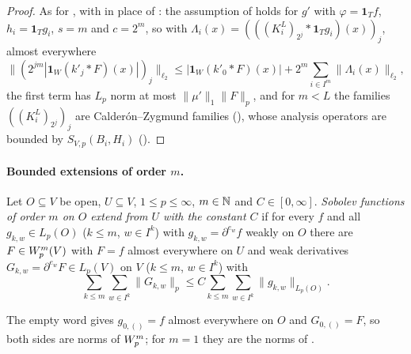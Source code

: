 \begin{proof}
\leanok
As for , with  in place of
: the assumption of 
holds for $g'$ with $\varphi = \mathbf 1_T f$, $h_i = \mathbf 1_T g_i$, $s = m$ and $c = 2^m$,
so with $\Lambda_i(x) = (((K^L_i)_{2^j} * \mathbf 1_T g_i)(x))_j$, almost everywhere
\[
  \bigl\|(2^{jm} |\mathbf 1_W (k'_j * F)(x)|)_j\bigr\|_{\ell_2}
  \leq |\mathbf 1_W (k'_0 * F)(x)| + 2^m \sum_{i \in I^m} \|\Lambda_i(x)\|_{\ell_2} ,
\]
the first term has $L_p$ norm at most $\|\mu'\|_1 \|F\|_p$, and for $m < L$ the families
$((K^L_i)_{2^j})_j$ are Calder\'on--Zygmund families (), whose
analysis operators are bounded by $S_{V,p}(B_i, H_i)$ ().
\end{proof}

\paragraph{Bounded extensions of order $m$.}

\begin{definition}
\label{def:extends-sobolev-order}
\leanok
{}
Let $O \subseteq V$ be open, $U \subseteq V$, $1 \leq p \leq \infty$, $m \in \mathbb{N}$ and
$C \in [0, \infty]$. \emph{Sobolev functions of order $m$ on $O$ extend from $U$ with the
constant $C$} if for every $f$ and all $g_{k,w} \in L_p(O)$ ($k \leq m$, $w \in I^k$) with
$g_{k,w} = \partial^{e_w} f$ weakly on $O$ there are $F \in W^{m}_{p}(V)$ with $F = f$ almost
everywhere on $U$ and weak derivatives $G_{k,w} = \partial^{e_w} F \in L_p(V)$ on $V$
($k \leq m$, $w \in I^k$) with
\[
  \sum_{k \leq m} \sum_{w \in I^k} \|G_{k,w}\|_p \leq C \sum_{k \leq m} \sum_{w \in I^k}
  \|g_{k,w}\|_{L_p(O)} .
\]
\end{definition}

The empty word gives $g_{0,()} = f$ almost everywhere on $O$ and $G_{0,()} = F$, so both sides
are norms of $W^{m}_{p}$; for $m = 1$ they are the norms of .


